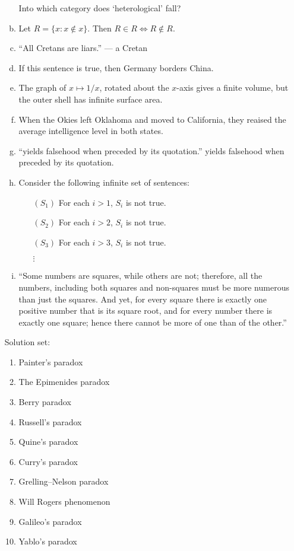 \documentclass{article}
\begin{document}
\begin{itemize}
\begin{enumerate}[(a)]
        Into which category does `heterological' fall?  
      \item Let $R = \{x : x \notin x\}$.  Then $R \in R \iff R \notin
        R$.
      \item ``All Cretans are liars.'' --- a Cretan
      \item If this sentence is true, then Germany borders China.
      \item The graph of $x \mapsto 1/x$, rotated about the $x$-axis
        gives a finite volume, but the outer shell has infinite surface
        area.
      \item When the Okies left Oklahoma and moved to California, they
        reaised the average intelligence level in both states.
      \item ``yields falsehood when preceded by its quotation.'' yields
        falsehood when preceded by its quotation.
      \item Consider the following infinite set of sentences:
        \begin{itemize}
          \item[$(S_1)$] For each $i > 1$, $S_i$ is not true.
          \item[$(S_2)$] For each $i > 2$, $S_i$ is not true.
          \item[$(S_3)$] For each $i > 3$, $S_i$ is not true.
          \item[$\vdots$]
        \end{itemize}
      \item ``Some numbers are squares, while others are not; therefore,
        all the numbers, including both squares and non-squares must be
        more numerous than just the squares.  And yet, for every square
        there is exactly one positive number that is its square root,
        and for every number there is exactly one square; hence there
        cannot be more of one than of the other.''
    \end{enumerate}

    Solution set:

    \begin{enumerate}[(1)]
      \item Painter's paradox
      \item The Epimenides paradox
      \item Berry paradox
      \item Russell's paradox
      \item Quine's paradox
      \item Curry's paradox
      \item Grelling--Nelson paradox
      \item Will Rogers phenomenon
      \item Galileo's paradox
      \item Yablo's paradox
    \end{enumerate}



\end{itemize}
\end{document}
